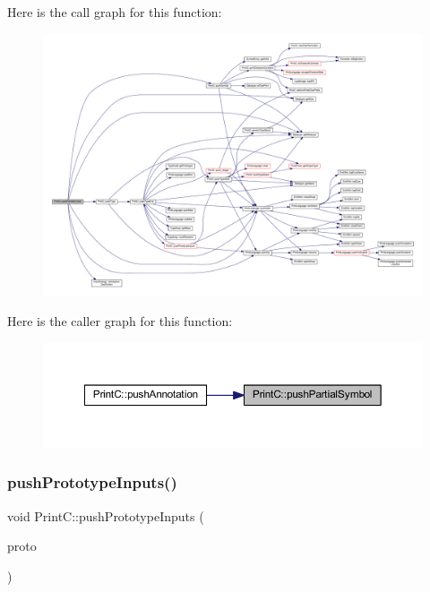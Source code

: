 Here is the call graph for this function\+:
\nopagebreak
\begin{figure}[H]
\begin{center}
\leavevmode
\includegraphics[width=350pt]{class_print_c_a0e8ab66b834858fbace8fd20357b5a63_cgraph}
\end{center}
\end{figure}
Here is the caller graph for this function\+:
\nopagebreak
\begin{figure}[H]
\begin{center}
\leavevmode
\includegraphics[width=350pt]{class_print_c_a0e8ab66b834858fbace8fd20357b5a63_icgraph}
\end{center}
\end{figure}
\mbox{\label{class_print_c_aae46702bfe38061e0c0563f7a8a20d82}} 
\subsubsection{\texorpdfstring{pushPrototypeInputs()}{pushPrototypeInputs()}}
{\footnotesize\ttfamily void Print\+C\+::push\+Prototype\+Inputs (\begin{DoxyParamCaption}\item[{const \mbox{\hyperlink{class_func_proto}{Func\+Proto}} $\ast$}]{proto }\end{DoxyParamCaption})\hspace{0.3cm}{\ttfamily [protected]}}



